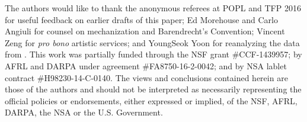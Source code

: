 
The authors would like to thank the anonymous referees at POPL and TFP 2016  for useful feedback on earlier drafts of this paper; Ed Morehouse and Carlo Angiuli for counsel on mechanization and Barendrecht's
Convention; Vincent Zeng for \textit{pro bono} artistic services; and YoungSeok Yoon for reanalyzing the data from \cite{6883030}. 
This work was partially funded through the NSF grant \#CCF-1439957; by AFRL and DARPA under agreement \#FA8750-16-2-0042; and by NSA lablet contract \#H98230-14-C-0140. The views and conclusions contained herein are those of the authors and should not be interpreted as necessarily representing the official policies or endorsements, either expressed or implied, of the NSF, AFRL, DARPA, the NSA or the U.S. Government.
